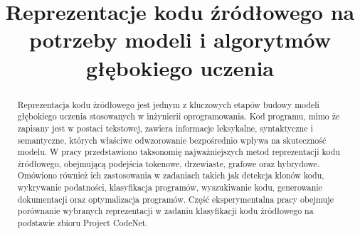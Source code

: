 \documentclass[conference]{IEEEtran}
\begin{document}
\title{Reprezentacje kodu źródłowego na potrzeby modeli i algorytmów głębokiego uczenia\\
}

\author{
\and
{}
\and
{}
\and
{}
\and
}

\maketitle

\renewcommand{\abstractname}{Streszczenie}
\begin{abstract}
Reprezentacja kodu źródłowego jest jednym z kluczowych etapów budowy modeli głębokiego uczenia stosowanych w inżynierii oprogramowania. Kod programu, mimo że zapisany jest w postaci tekstowej, zawiera informacje leksykalne, syntaktyczne i semantyczne, których właściwe odwzorowanie bezpośrednio wpływa na skuteczność modelu. W pracy przedstawiono taksonomię najważniejszych metod reprezentacji kodu źródłowego, obejmującą podejścia tokenowe, drzewiaste, grafowe oraz hybrydowe. Omówiono również ich zastosowania w zadaniach takich jak detekcja klonów kodu, wykrywanie podatności, klasyfikacja programów, wyszukiwanie kodu, generowanie dokumentacji oraz optymalizacja programów. Część eksperymentalna pracy obejmuje porównanie wybranych reprezentacji w zadaniu klasyfikacji kodu źródłowego na podstawie zbioru Project CodeNet. 
\end{abstract}
\end{document}
